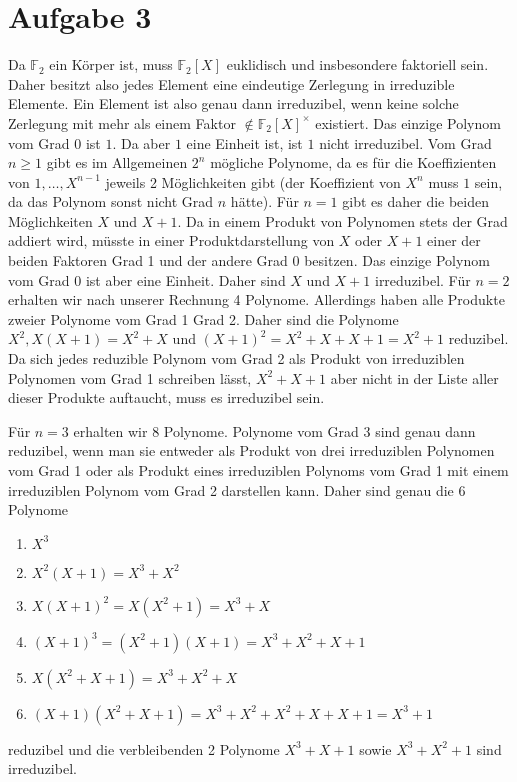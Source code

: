 \documentclass{article}
\begin{document}
    \section*{Aufgabe 3}
    Da $\mathbb{F}_2$ ein Körper ist, muss $\mathbb{F}_2[X]$ euklidisch und insbesondere faktoriell sein. Daher besitzt also jedes Element eine eindeutige Zerlegung in irreduzible Elemente. Ein Element ist also genau dann irreduzibel, wenn keine solche Zerlegung mit mehr als einem Faktor $\notin \mathbb{F}_2[X]^\times$ existiert.
    Das einzige Polynom vom Grad $0$ ist $1$. Da aber $1$ eine Einheit ist, ist $1$ nicht irreduzibel. Vom Grad $n \geq 1$ gibt es im Allgemeinen $2^n$ mögliche Polynome, da es für die Koeffizienten von $1, \dots, X^{n-1}$ jeweils 2 Möglichkeiten gibt (der Koeffizient von $X^n$ muss $1$ sein, da das Polynom sonst nicht Grad $n$ hätte). Für $n = 1$ gibt es daher die beiden Möglichkeiten $X$ und $X + 1$. Da in einem Produkt von Polynomen stets der Grad addiert wird, müsste in einer Produktdarstellung von $X$ oder $X+1$ einer der beiden Faktoren Grad 1 und der andere Grad 0 besitzen. Das einzige Polynom vom Grad 0 ist aber eine Einheit. Daher sind $X$ und $X + 1$ irreduzibel. 
    Für $n = 2$ erhalten wir nach unserer Rechnung 4 Polynome. Allerdings haben alle Produkte zweier Polynome vom Grad 1 Grad 2. Daher sind die Polynome $X^2, X (X + 1) = X^2 + X$ und $(X + 1)^2 = X^2 + X + X + 1 = X^2 + 1$ reduzibel. Da sich jedes reduzible Polynom vom Grad 2 als Produkt von irreduziblen Polynomen vom Grad 1 schreiben lässt, $X^2 + X + 1$ aber nicht in der Liste aller dieser Produkte auftaucht, muss es irreduzibel sein.
    
    Für $n = 3$ erhalten wir $8$ Polynome. Polynome vom Grad 3 sind genau dann reduzibel, wenn man sie entweder als Produkt von drei irreduziblen Polynomen vom Grad 1 oder als Produkt eines irreduziblen Polynoms vom Grad 1 mit einem irreduziblen Polynom vom Grad 2 darstellen kann. Daher sind genau die 6 Polynome 
    \begin{enumerate}
        \item $X^3$
        \item $X^2(X + 1) = X^3 + X^2$
        \item $X(X+1)^2 = X(X^2 + 1) = X^3 + X$
        \item $(X + 1)^3 = (X^2 + 1)(X + 1) = X^3 + X^2 + X + 1$
        \item $X(X^2 + X + 1) = X^3 + X^2 + X$
        \item $(X + 1)(X^2 + X + 1) = X^3 + X^2 + X^2 + X + X + 1 = X^3 + 1$
    \end{enumerate}
    reduzibel und die verbleibenden 2 Polynome $X^3 + X + 1$ sowie $X^3 + X^2 + 1$ sind irreduzibel.
\end{document}
